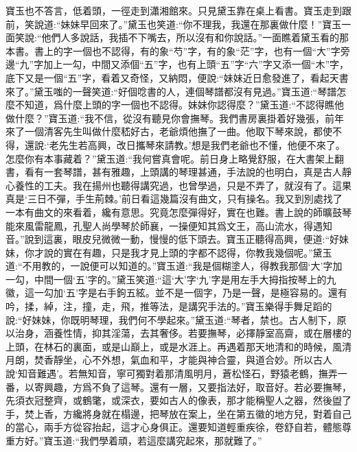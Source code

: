 \begin{parag}
    寶玉也不答言，低着頭，一徑走到瀟湘館來。只見黛玉靠在桌上看書。寶玉走到跟前，笑說道:“妹妹早回來了。”黛玉也笑道:“你不理我，我還在那裏做什麼！”寶玉一面笑說:“他們人多說話，我插不下嘴去，所以沒有和你說話。”一面瞧着黛玉看的那本書。書上的字一個也不認得，有的象“芍”字，有的象“茫”字，也有一個“大”字旁邊“九”字加上一勾，中間又添個“五”字，也有上頭“五”字“六”字又添一個“木”字，底下又是一個“五”字，看着又奇怪，又納悶，便說:“妹妹近日愈發進了，看起天書來了。”黛玉嗤的一聲笑道:“好個唸書的人，連個琴譜都沒有見過。”寶玉道:“琴譜怎麼不知道，爲什麼上頭的字一個也不認得。妹妹你認得麼？”黛玉道:“不認得瞧他做什麼？”寶玉道:“我不信，從沒有聽見你會撫琴。我們書房裏掛着好幾張，前年來了一個清客先生叫做什麼嵇好古，老爺煩他撫了一曲。他取下琴來說，都使不得，還說:‘老先生若高興，改日攜琴來請教。’想是我們老爺也不懂，他便不來了。怎麼你有本事藏着？”黛玉道:“我何嘗真會呢。前日身上略覺舒服，在大書架上翻書，看有一套琴譜，甚有雅趣，上頭講的琴理甚通，手法說的也明白，真是古人靜心養性的工夫。我在揚州也聽得講究過，也曾學過，只是不弄了，就沒有了。這果真是‘三日不彈，手生荊棘。’前日看這幾篇沒有曲文，只有操名。我又到別處找了一本有曲文的來看着，纔有意思。究竟怎麼彈得好，實在也難。書上說的師曠鼓琴能來風雷龍鳳，孔聖人尚學琴於師襄，一操便知其爲文王，高山流水，得遇知音。”說到這裏，眼皮兒微微一動，慢慢的低下頭去。寶玉正聽得高興，便道:“好妹妹，你才說的實在有趣，只是我才見上頭的字都不認得，你教我幾個呢。”黛玉道:“不用教的，一說便可以知道的。”寶玉道:“我是個糊塗人，得教我那個‘大’字加一勾，中間一個‘五’字的。”黛玉笑道:“這‘大’字‘九’字是用左手大拇指按琴上的九徽，這一勾加‘五’字是右手鉤五絃。並不是一個字，乃是一聲，是極容易的。還有吟，揉，綽，注，撞，走，飛，推等法，是講究手法的。”寶玉樂得手舞足蹈的說:“好妹妹，你既明琴理，我們何不學起來。”黛玉道:“琴者，禁也。古人制下，原以治身，涵養性情，抑其淫蕩，去其奢侈。若要撫琴，必擇靜室高齋，或在層樓的上頭，在林石的裏面，或是山巔上，或是水涯上。再遇着那天地清和的時候，風清月朗，焚香靜坐，心不外想，氣血和平，才能與神合靈，與道合妙。所以古人說‘知音難遇’。若無知音，寧可獨對着那清風明月，蒼松怪石，野猿老鶴，撫弄一番，以寄興趣，方爲不負了這琴。還有一層，又要指法好，取音好。若必要撫琴，先須衣冠整齊，或鶴氅，或深衣，要如古人的像表，那才能稱聖人之器，然後盥了手，焚上香，方纔將身就在榻邊，把琴放在案上，坐在第五徽的地方兒，對着自己的當心，兩手方從容抬起，這才心身俱正。還要知道輕重疾徐，卷舒自若，體態尊重方好。”寶玉道:“我們學着頑，若這麼講究起來，那就難了。”
\end{parag}



